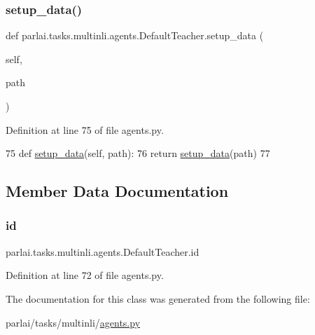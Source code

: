 \subsubsection{\texorpdfstring{setup\+\_\+data()}{setup\_data()}}
{\footnotesize\ttfamily def parlai.\+tasks.\+multinli.\+agents.\+Default\+Teacher.\+setup\+\_\+data (\begin{DoxyParamCaption}\item[{}]{self,  }\item[{}]{path }\end{DoxyParamCaption})}



Definition at line 75 of file agents.\+py.


\begin{DoxyCode}
75     \textcolor{keyword}{def }\hyperlink{namespaceparlai_1_1tasks_1_1multinli_1_1agents_a4fa2cb0ba1ed745336ad8bceed36b841}{setup\_data}(self, path):
76         \textcolor{keywordflow}{return} \hyperlink{namespaceparlai_1_1tasks_1_1multinli_1_1agents_a4fa2cb0ba1ed745336ad8bceed36b841}{setup\_data}(path)
77 \end{DoxyCode}


\subsection{Member Data Documentation}
\mbox{\label{classparlai_1_1tasks_1_1multinli_1_1agents_1_1DefaultTeacher_a2eacc99d6289f9184e166de045beeade}} 
\subsubsection{\texorpdfstring{id}{id}}
{\footnotesize\ttfamily parlai.\+tasks.\+multinli.\+agents.\+Default\+Teacher.\+id}



Definition at line 72 of file agents.\+py.



The documentation for this class was generated from the following file\+:\begin{DoxyCompactItemize}
\item 
parlai/tasks/multinli/\hyperlink{parlai_2tasks_2multinli_2agents_8py}{agents.\+py}\end{DoxyCompactItemize}
